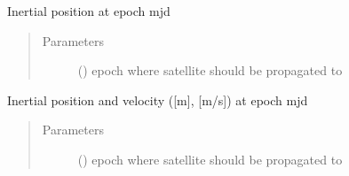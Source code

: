 \documentclass[letterpaper,10pt,english]{sphinxmanual}
\begin{document}
\begin{fulllineitems}

\begin{fulllineitems}
\label{\detokenize{modules/propagator_sgp4:propagator_sgp4.SGP4.R_EARTH}}
\end{fulllineitems}


\begin{fulllineitems}
\label{\detokenize{modules/propagator_sgp4:propagator_sgp4.SGP4.S0}}
\end{fulllineitems}


\begin{fulllineitems}
\label{\detokenize{modules/propagator_sgp4:propagator_sgp4.SGP4.WGS}}
\end{fulllineitems}


\begin{fulllineitems}
\label{\detokenize{modules/propagator_sgp4:propagator_sgp4.SGP4.position}}
Inertial position at epoch mjd
\begin{quote}\begin{description}
\item[{Parameters}] \leavevmode
{} () \textendash{} epoch where satellite should be propagated to

\end{description}\end{quote}

\end{fulllineitems}


\begin{fulllineitems}
\label{\detokenize{modules/propagator_sgp4:propagator_sgp4.SGP4.state}}
Inertial position and velocity ({[}m{]}, {[}m/s{]}) at epoch mjd
\begin{quote}\begin{description}
\item[{Parameters}] \leavevmode
{} () \textendash{} epoch where satellite should be propagated to


\end{description}
\end{quote}
\end{fulllineitems}
\end{fulllineitems}
\end{document}
